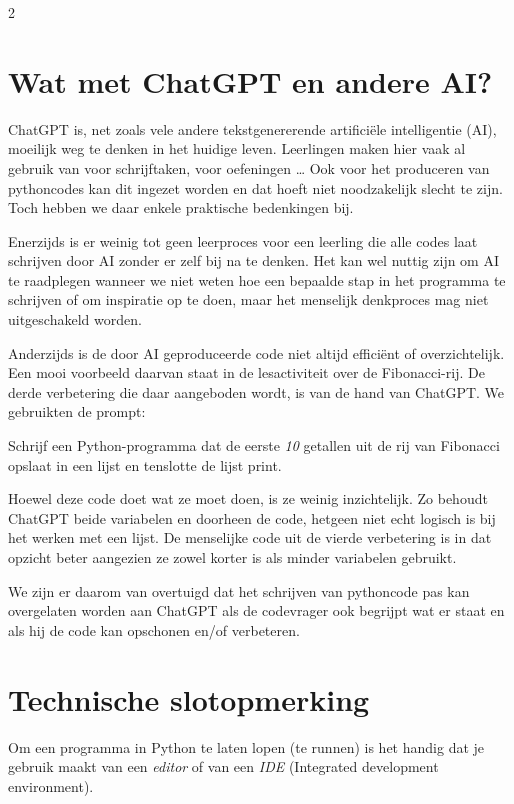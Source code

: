 \begin{multicols}{2}


        
        \section{Wat met ChatGPT en andere AI?}
        ChatGPT is, net zoals vele andere tekstgenererende artificiële intelligentie (AI), moeilijk weg te denken in het huidige leven. Leerlingen maken hier vaak al gebruik van voor schrijftaken, voor oefeningen \ldots{} Ook voor het produceren van pythoncodes kan dit ingezet worden en dat hoeft niet noodzakelijk slecht te zijn. Toch hebben we daar enkele praktische bedenkingen bij.

        Enerzijds is er weinig tot geen leerproces voor een leerling die alle codes laat schrijven door AI zonder er zelf bij na te denken. Het kan wel nuttig zijn om AI te raadplegen wanneer we niet weten hoe een bepaalde stap in het programma te schrijven of om inspiratie op te doen, maar het menselijk denkproces mag niet uitgeschakeld worden.

        Anderzijds is de door AI geproduceerde code niet altijd effici\"ent of overzichtelijk. Een mooi voorbeeld daarvan staat in de lesactiviteit over de Fibonacci-rij. De derde verbetering die daar aangeboden wordt, is van de hand van ChatGPT. We gebruikten de prompt: \begin{citaat}
            Schrijf een Python-programma dat de eerste \emph{10} getallen uit de rij van Fibonacci opslaat in een lijst en tenslotte de lijst print.
        \end{citaat}
        Hoewel deze code doet wat ze moet doen, is ze weinig inzichtelijk. Zo behoudt ChatGPT beide variabelen  en  doorheen de code, hetgeen niet echt logisch is bij het werken met een lijst. De menselijke code uit de vierde verbetering is in dat opzicht beter aangezien ze zowel korter is als minder variabelen gebruikt.

        We zijn er daarom van overtuigd dat het schrijven van pythoncode pas kan overgelaten worden aan ChatGPT als de codevrager ook begrijpt wat er staat en als hij de code kan opschonen en/of verbeteren.

\section{Technische slotopmerking} \label{sec:technisch}
Om een programma in Python te laten lopen (te runnen)  is het handig dat je gebruik maakt van een \emph{editor} of van een \emph{IDE} (Integrated development environment). 


\end{multicols}
